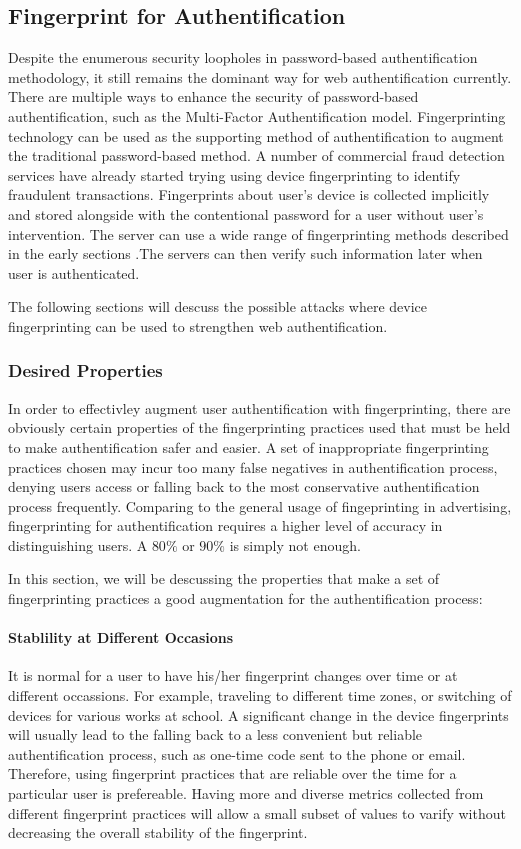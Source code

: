 \documentclass{acm_proc_article-sp}
\begin{document}
\subsection{Fingerprint for Authentification}
Despite the enumerous security loopholes in password-based authentification methodology, it still remains the dominant way for web authentification currently. There are multiple ways to enhance the security of password-based authentification, such as the Multi-Factor Authentification model. 
Fingerprinting technology can be used as the supporting method of authentification to augment the traditional password-based method.
A number of commercial fraud detection services have already started trying using device fingerprinting to identify fraudulent transactions.\cite{maxmind} \cite{parame} Fingerprints about user's device is collected implicitly and stored alongside with the contentional password for a user without user's intervention.  The server can use a wide range of fingerprinting methods described in the early sections .The servers can then verify such information later when user is authenticated.

The following sections will descuss the possible attacks where device fingerprinting can be used to strengthen web authentification.


\subsubsection{Desired Properties}
In order to effectivley augment user authentification with fingerprinting, there are obviously certain properties of the fingerprinting practices used that must be held to make authentification safer and easier. A set of inappropriate fingerprinting practices chosen may incur too many false negatives in authentification process, denying users access or falling back to the most conservative authentification process frequently. 
Comparing to the general usage of fingeprinting in advertising, fingerprinting for authentification requires a higher level of accuracy in distinguishing users. A $80\%$ or $90\%$ is simply not enough. \cite{alca:dev}

In this section, we will be descussing the properties that make a set of fingerprinting practices a good augmentation for the authentification process:

\paragraph{ Stablility at Different Occasions}
It is normal for a user to have his/her fingerprint changes over time or at different occassions. For example, traveling to different time zones, or switching of devices for various works at school. 
A significant change in the device fingerprints will usually lead to the falling back to a less convenient but reliable authentification process, such as one-time code sent to the phone or email. Therefore, using fingerprint practices that are reliable over the time for a particular user is prefereable. Having more and diverse metrics collected from different fingerprint practices will allow a small subset of values to varify without decreasing the overall stability of the
fingerprint.
\end{document}
